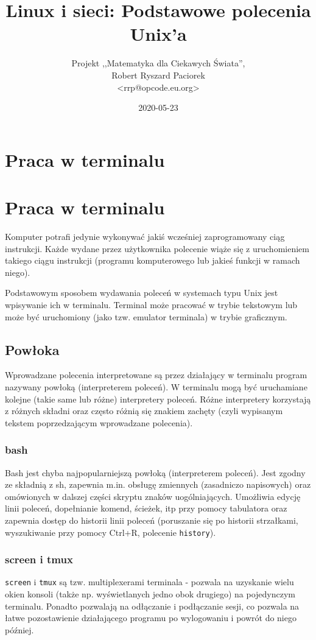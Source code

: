 \documentclass{pdfBooklets}
\title{Linux i sieci: Podstawowe polecenia Unix'a}
\author{%
	Projekt ,,Matematyka dla Ciekawych Świata'',\\
	Robert Ryszard Paciorek\\\normalsize\ttfamily <rrp@opcode.eu.org>
}
\date  {2020-05-23}
\begin{document}
\maketitle

\section{Praca w terminalu}

\section{Praca w terminalu}

Komputer potrafi jedynie wykonywać jakiś wcześniej zaprogramowany ciąg instrukcji.
Każde wydane przez użytkownika polecenie wiąże się z uruchomieniem takiego ciągu instrukcji (programu komputerowego lub jakieś funkcji w ramach niego).

Podstawowym sposobem wydawania poleceń w systemach typu Unix jest wpisywanie ich w terminalu.
Terminal może pracować w trybie tekstowym lub może być uruchomiony (jako tzw. emulator terminala) w trybie graficznym.

\subsection{Powłoka}

Wprowadzane polecenia interpretowane są przez działający w terminalu program nazywany powłoką (interpreterem poleceń).
W terminalu mogą być uruchamiane kolejne (takie same lub różne) interpretery poleceń.
Różne interpretery korzystają z różnych składni oraz często różnią się znakiem zachęty (czyli wypisanym tekstem poprzedzającym wprowadzane polecenia).

\subsubsection{bash}
Bash jest chyba najpopularniejszą powłoką (interpreterem poleceń).
Jest zgodny ze składnią z sh, zapewnia m.in. obsługę zmiennych (zasadniczo napisowych) oraz omówionych w dalszej części skryptu znaków uogólniających.
Umożliwia edycję linii poleceń, dopełnianie komend, ścieżek, itp przy pomocy tabulatora oraz zapewnia dostęp do historii linii poleceń (poruszanie się po historii strzałkami, wyszukiwanie przy pomocy Ctrl+R, polecenie \texttt{history}).

\subsubsection{screen i tmux}
\texttt{screen} i \texttt{tmux} są tzw. multiplexerami terminala - pozwala na uzyskanie wielu okien konsoli (także np. wyświetlanych jedno obok drugiego) na pojedynczym terminalu.
Ponadto pozwalają na odłączanie i podłączanie sesji, co pozwala na łatwe pozostawienie działającego programu po wylogowaniu i powrót do niego później.
\end{document}

